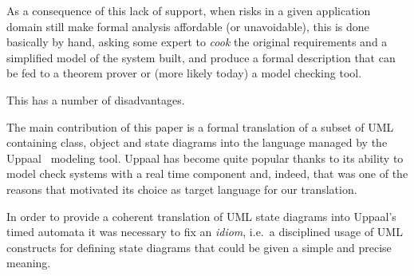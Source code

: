 

As a consequence of this lack of support, when risks in a given
application domain still make formal analysis affordable (or
unavoidable), this is done basically by hand, asking some expert to
\emph{cook} the original requirements and a simplified model of the
system built, and produce a formal description that can be fed to a
theorem prover or (more likely today) a model checking tool.


This has a number of disadvantages. 


The main contribution of this paper is a formal translation of a subset
of UML containing class, object and state diagrams into the language
managed by the Uppaal~\cite{so51010} modeling tool. Uppaal has become
quite popular thanks to its ability to model check systems with a real
time component and, indeed, that was one of the reasons that motivated its
choice as target language for our translation.

In order to provide a coherent translation of UML state diagrams into
Uppaal's timed automata it was necessary to fix an \emph{idiom},
i.e.~a disciplined usage of UML constructs for defining state diagrams
that could be given a simple and precise meaning. 

